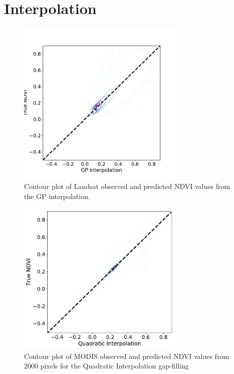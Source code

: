 \documentclass[review]{elsarticle}
\begin{document}
\newpage
\section{Interpolation}

\begin{figure} 
	\centering
	\includegraphics[trim = 30mm 5mm 5mm 15mm,width=8cm]{figures/interp_GP.pdf}
	\caption{Contour plot of Landsat observed and predicted NDVI values from the GP interpolation.} \label{fig:interp_GP}
\end{figure}


\begin{figure} 
	\centering
	\includegraphics[trim = 30mm 5mm 5mm 15mm,width=8cm]{figures/QuadraticInt_contour.pdf} 
	\caption{Contour plot of MODIS observed and predicted NDVI values from 2000 pixels for the Quadratic Interpolation gap-filling} \label{fig:interpScatter}
\end{figure}

\end{document}
